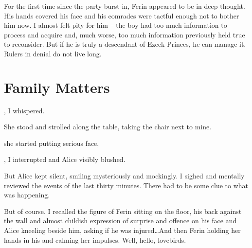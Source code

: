 For the first time since the party burst in, Ferin appeared to be in deep thought. His hands covered his face and his comrades were tactful enough not to bother him now. I almost felt pity for him -- the boy had too much information to process and acquire and, much worse, too much information previously held true to reconsider. But if he is truly a descendant of Ezeek Princes, he can manage it. Rulers in denial do not live long.

\section{Family Matters}

, I whispered. 

She stood and strolled along the table, taking the chair next to mine.



 she started putting serious face, 

, I interrupted and Alice visibly blushed. 

But Alice kept silent, smiling mysteriously and mockingly. I sighed and mentally reviewed the events of the last thirty minutes. There had to be some clue to what was happening.

But of course. I recalled the figure of Ferin sitting on the floor, his back against the wall and almost childish expression of surprise and offence on his face and Alice kneeling beside him, asking if he was injured\dots And then Ferin holding her hands in his and calming her impulses. Well, hello, lovebirds.

